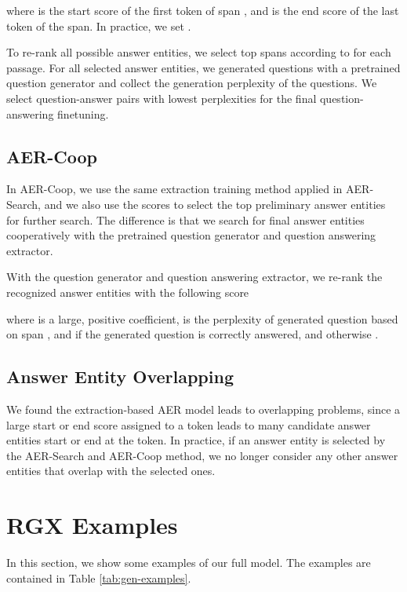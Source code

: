 \documentclass[11pt,a4paper]{article}
\begin{document}
where  is the start score of the first token of span , and  is the end score of the last token of the span. In practice, we set .

To re-rank all possible answer entities, we select top  spans according to  for each passage. For all selected answer entities, we generated questions with a pretrained question generator and collect the generation perplexity of the questions. We select  question-answer pairs with lowest perplexities for the final question-answering finetuning.

\subsection{AER-Coop}
In AER-Coop, we use the same extraction training method applied in AER-Search, and we also use the  scores to select the top  preliminary answer entities for further search. The difference is that we search for final answer entities cooperatively with the pretrained question generator and question answering extractor.

With the question generator and question answering extractor, we re-rank the recognized answer entities with the following score

where  is a large, positive coefficient,  is the perplexity of generated question based on span , and  if the generated question is correctly answered, and otherwise .

\subsection{Answer Entity Overlapping}
We found the extraction-based AER model leads to overlapping problems, since a large start or end score assigned to a token leads to many candidate answer entities start or end at the token. In practice, if an answer entity is selected by the AER-Search and AER-Coop method, we no longer consider any other answer entities that overlap with the selected ones.

\section{RGX Examples}
\label{sec:examples}
In this section, we show some examples of our full model. The examples are contained in Table \ref{tab:gen-examples}.
\end{document}
